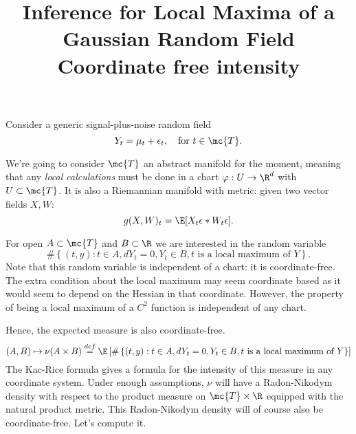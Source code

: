 \documentclass{article}
\title{ {\bf Inference for Local Maxima of a Gaussian Random Field} \\ Coordinate free intensity}
\begin{document}
	
	\maketitle
	\RaggedRight
	
	Consider a generic signal-plus-noise random field
	\begin{equation}
		\label{eqn:signal-plus-noise}
		Y_t = \mu_t + \epsilon_t, \quad {\rm for} ~ t \in \mc{T}.
	\end{equation}

        We're going to consider $\mc{T}$ an abstract manifold for the moment, meaning that any {\em local calculations}
        must be done in a chart $\varphi: U \rightarrow \R^d$ with $U \subset \mc{T}$.
        It is also a Riemannian manifold with metric: given two vector fields $X, W$:
\begin{equation}
        g(X,W)_t = \E[X_t\epsilon * W_t\epsilon].
\end{equation}

For open $A \subset \mc{T}$ and $B \subset \R$ we are interested in the random variable
\begin{equation}
  \# \left\{(t,y): t \in A, dY_t = 0, Y_t \in B, \text{$t$ is a local maximum of $Y$}  \right\}.
  \end{equation}
Note that this random variable is independent of a chart: it is coordinate-free. The extra condition
about the local maximum may seem coordinate based as it would seem to depend on the Hessian
in that coordinate. However, the property of being a local maximum of a $C^2$ function is independent of any chart.

Hence, the expected measure  is also coordinate-free.
$$
(A, B) \mapsto \nu(A \times B) \overset{def}{=} \E \left[\# \left\{(t,y): t \in A, dY_t = 0, Y_t \in B, \text{$t$ is a local maximum of $Y$}  \right\}\right] 
$$
The Kac-Rice formula gives a formula for the intensity of this measure in any coordinate system. Under enough assumptions,
$\nu$ will have a Radon-Nikodym density with respect to the product measure on $\mc{T} \times \R$ equipped with the natural product metric.
This Radon-Nikodym density will of course also be coordinate-free. Let's compute it.
\end{document}
